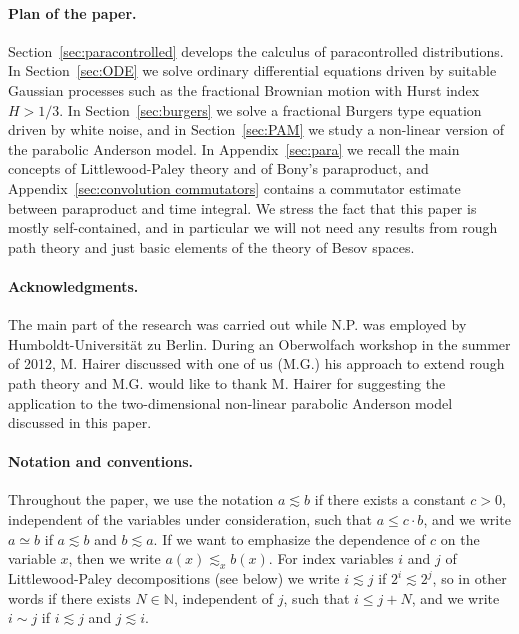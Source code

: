 \documentclass[11pt,a4paper]{article}
\theoremstyle{remark}
\begin{document}
\paragraph{Plan of the paper.}

Section~\ref{sec:paracontrolled} develops the calculus of paracontrolled distributions. In Section~\ref{sec:ODE} we solve ordinary differential equations driven by suitable Gaussian processes such as the fractional Brownian motion with Hurst index $H>1/3$. In Section~\ref{sec:burgers} we solve a fractional Burgers type equation driven by white noise, and in Section~\ref{sec:PAM} we study a non-linear version of the parabolic Anderson model. %
In Appendix~\ref{sec:para} we recall the main concepts of Littlewood-Paley theory and of Bony's paraproduct, and Appendix~\ref{sec:convolution commutators} contains a commutator estimate between paraproduct and time integral. We stress the fact that this paper is mostly self-contained, and in particular we will not need any results from rough path theory and just basic elements of the theory of Besov spaces.



\paragraph{Acknowledgments.} The main part of the research was carried out while N.P. was employed by Humboldt-Universit\"at zu Berlin.
During an Oberwolfach workshop in the summer of 2012, M. Hairer discussed with one of us (M.G.) his approach to extend rough
path theory and  M.G. would like
to thank M. Hairer for suggesting the application to the two-dimensional non-linear
parabolic Anderson model discussed in this paper.



\paragraph{Notation and conventions.}%

Throughout the paper, we use the notation $a \lesssim b$ if there exists a constant $c>0$, independent of the variables under consideration, such that $a \leqslant c \cdot b$, and we write $a \simeq b$ if $a \lesssim b$ and $b \lesssim a$. If we want to emphasize the dependence of $c$ on the variable $x$, then we write $a(x) \lesssim_{x} b(x)$. For index variables $i$ and $j$ of Littlewood-Paley decompositions (see below) we write $i \lesssim j$ if $2^i \lesssim 2^j$, so in other words if there exists $N \in \mathbb{N}$, independent of $j$, such that $i \leqslant j +N$, and we write $i \sim j$ if $i \lesssim j$ and $j \lesssim i$.
\end{document}
